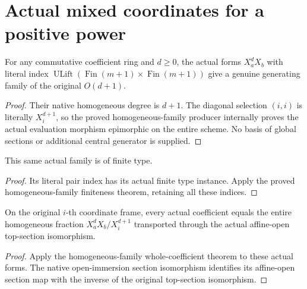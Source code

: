\section{Actual mixed coordinates for a positive power}
\begin{definition}
\label{def:central-embedding-actual-mixed-coordinate-family}
\leanok
For any commutative coefficient ring and $d\geq0$, the actual forms
$X_a^dX_b$ with literal index $\operatorname{ULift}(\operatorname{Fin}(m+1)\times\operatorname{Fin}(m+1))$
give a genuine generating family of the original $O(d+1)$.
\end{definition}
\begin{proof}
Their native homogeneous degree is $d+1$. The diagonal selection $(i,i)$
is literally $X_i^{d+1}$, so the proved homogeneous-family producer internally
proves the actual evaluation morphism epimorphic on the entire scheme.
No basis of global sections or additional central generator is supplied.
\end{proof}
\begin{lemma}
\label{lem:central-embedding-actual-mixed-coordinate-family-finite}
\leanok
This same actual family is of finite type.
\end{lemma}
\begin{proof}
Its literal pair index has its actual finite type instance. Apply the proved
homogeneous-family finiteness theorem, retaining all these indices.
\end{proof}
\begin{lemma}
\label{lem:central-embedding-actual-mixed-coordinate-family-coefficients}
\leanok
On the original $i$-th coordinate frame, every actual coefficient equals the
entire homogeneous fraction $X_a^dX_b/X_i^{d+1}$ transported through the actual
affine-open top-section isomorphism.
\end{lemma}
\begin{proof}
Apply the homogeneous-family whole-coefficient theorem to these actual forms.
The native open-immersion section isomorphism identifies its affine-open
section map with the inverse of the original top-section isomorphism.
\end{proof}

